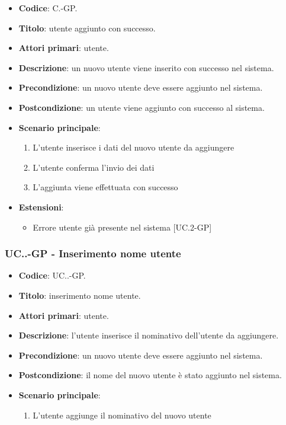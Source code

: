 		\begin{itemize}
			\item \textbf{Codice}: C\theuccount.\thesubuccount-GP.
			\item \textbf{Titolo}: utente aggiunto con successo.
			\item \textbf{Attori primari}: utente.
			\item \textbf{Descrizione}: un nuovo utente viene inserito con successo nel sistema.
			\item \textbf{Precondizione}: un nuovo utente deve essere aggiunto nel sistema.
			\item \textbf{Postcondizione}: un utente viene aggiunto con successo al sistema.
			\item \textbf{Scenario principale}:
			\begin{enumerate}
				\item L'utente inserisce i dati del nuovo utente da aggiungere
				\item L'utente conferma l'invio dei dati
				\item L'aggiunta viene effettuata con successo
			\end{enumerate}
			\item \textbf{Estensioni}:
			\begin{itemize}
				\item Errore utente già presente nel sistema [UC\theuccount.2-GP]
			\end{itemize}
		\end{itemize}
		
		\subsubsection{UC\theuccount.\thesubuccount.\thesubsubuccount-GP - Inserimento nome utente}
			
			\begin{itemize}
				\item \textbf{Codice}: UC\theuccount.\thesubuccount.\thesubsubuccount-GP.
				\item \textbf{Titolo}: inserimento nome utente.
				\item \textbf{Attori primari}: utente.
				\item \textbf{Descrizione}: l'utente inserisce il nominativo dell'utente da aggiungere.
				\item \textbf{Precondizione}: un nuovo utente deve essere aggiunto nel sistema.
				\item \textbf{Postcondizione}: il nome del nuovo utente è stato aggiunto nel sistema.
				\item \textbf{Scenario principale}:
				\begin{enumerate}
					\item L'utente aggiunge il nominativo del nuovo utente
				\end{enumerate}
			\end{itemize}
		
